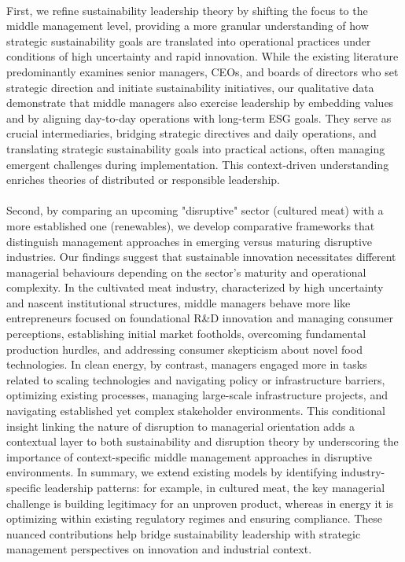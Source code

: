 	\paragraph*{} First, we refine sustainability leadership theory by shifting the focus to the middle management level, providing a more granular understanding of how strategic sustainability goals are translated into operational practices under conditions of high uncertainty and rapid innovation. While the existing literature predominantly examines senior managers, CEOs, and boards of directors who set strategic direction and initiate sustainability initiatives, our qualitative data demonstrate that middle managers also exercise leadership by embedding values and by aligning day-to-day operations with long-term ESG goals. They serve as crucial intermediaries, bridging strategic directives and daily operations, and translating strategic sustainability goals into practical actions, often managing emergent challenges during implementation. This context-driven understanding enriches theories of distributed or responsible leadership.
	
	\paragraph*{} Second, by comparing an upcoming "disruptive" sector (cultured meat) with a more established one (renewables), we develop comparative frameworks that distinguish management approaches in emerging versus maturing disruptive industries. Our findings suggest that sustainable innovation necessitates different managerial behaviours depending on the sector’s maturity and operational complexity. In the cultivated meat industry, characterized by high uncertainty and nascent institutional structures, middle managers behave more like entrepreneurs focused on foundational R\&D innovation and managing consumer perceptions, establishing initial market footholds, overcoming fundamental production hurdles, and addressing consumer skepticism about novel food technologies. In clean energy, by contrast, managers engaged more in tasks related to scaling technologies and navigating policy or infrastructure barriers, optimizing existing processes, managing large-scale infrastructure projects, and navigating established yet complex stakeholder environments. This conditional insight linking the nature of disruption to managerial orientation adds a contextual layer to both sustainability and disruption theory by underscoring the importance of context-specific middle management approaches in disruptive environments. In summary, we extend existing models by identifying industry-specific leadership patterns: for example, in cultured meat, the key managerial challenge is building legitimacy for an unproven product, whereas in energy it is optimizing within existing regulatory regimes and ensuring compliance. These nuanced contributions help bridge sustainability leadership with strategic management perspectives on innovation and industrial context.
	
